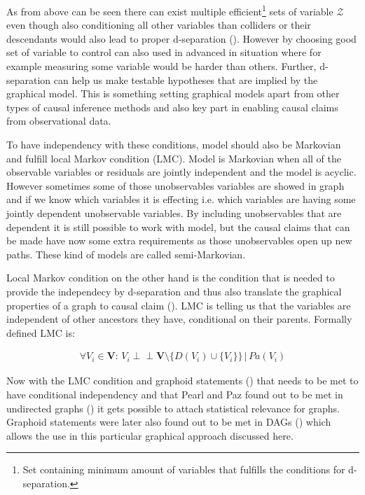 \documentclass[main=english,12pt,a4paper,pdftex,econ,utf8]{aaltothesis}
\newcommand{\indep}{\perp \!\!\! \perp}
\newcommand{\pa}[1]{Pa(#1)}
\newcommand{\z}{\mathcal{Z}}
\newcommand{\vars}{\bm{V}}
\begin{document}
As from above can be seen there can exist multiple efficient{\hypersetup{linkcolor=black}\footnote{Set containing minimum amount of variables that fulfills the conditions for d-separation.}} sets of variable $\z$ even though also conditioning all other variables than colliders or their descendants would also lead to proper d-separation (\cite{Pearl2016}). However by choosing good set of variable to control can also used in advanced in situation where for example measuring some variable would be harder than others. Further, d-separation can help us make testable hypotheses that are implied by the graphical model. This is something setting graphical models apart from other types of causal inference methods and also key part in enabling causal claims from observational data.



To have independency with these conditions, model should also be Markovian and fulfill local Markov condition (LMC). Model is Markovian when all of the observable variables or residuals are jointly independent and the model is acyclic. However sometimes some of those unobservables variables are showed in graph and if we know which variables it is effecting i.e. which variables are having some jointly dependent unobservable variables. By including unobservables that are dependent it is still possible to work with model, but the causal claims that can be made have now some extra requirements as those unobservables open up new paths. These kind of models are called semi-Markovian.

Local Markov condition on the other hand is the condition that is needed to provide the independecy by d-separation and thus also translate the graphical properties of a graph to causal claim (\cite{Heckman2015}). LMC is telling us that the variables are independent of other ancestors they have, conditional on their parents. Formally defined LMC is:

\begin{gather} \label{eq:lmc}
    \forall V_{i}\in\vars\text{: }V_{i}\indep\vars\setminus\{D(V_{i})\cup \{V_{i}\}\}\,|\,\pa{V_{i}}
\end{gather}

Now with the LMC condition and graphoid statements (\cite{Dawid1979}) that needs to be met to have conditional independency and that Pearl and Paz found out to be met in undirected graphs (\cite{Paz1985}) it gets possible to attach statistical relevance for graphs. Graphoid statements were later also found out to be met in DAGs (\cite{Pearl1986}) which allows the use in this particular graphical approach discussed here.
\end{document}
